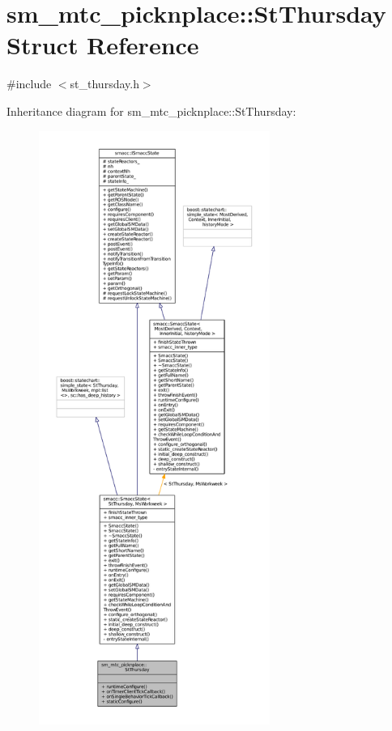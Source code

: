 \hypertarget{structsm__mtc__picknplace_1_1StThursday}{}\section{sm\+\_\+mtc\+\_\+picknplace\+:\+:St\+Thursday Struct Reference}
\label{structsm__mtc__picknplace_1_1StThursday}


{\ttfamily \#include $<$st\+\_\+thursday.\+h$>$}



Inheritance diagram for sm\+\_\+mtc\+\_\+picknplace\+:\+:St\+Thursday\+:
\nopagebreak
\begin{figure}[H]
\begin{center}
\leavevmode
\includegraphics[height=550pt]{structsm__mtc__picknplace_1_1StThursday__inherit__graph}
\end{center}
\end{figure}


